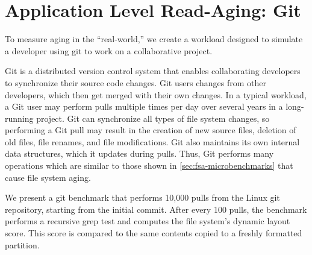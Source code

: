 \section{Application Level Read-Aging: Git}\label{sec:fsa-git}

To measure aging in the ``real-world,'' we create a workload designed to
simulate a developer using git to work on a collaborative project.

Git is a distributed version control system that enables collaborating
developers to synchronize their source code changes.  Git users 
changes from other developers, which then get merged with their own changes.
In a typical workload, a Git user may perform pulls multiple times per day over
several years in a long-running project.  Git can synchronize all types of file
system changes, so performing a Git pull may result in the creation of new
source files, deletion of old files, file renames, and file modifications.  Git
also maintains its own internal data structures, which it updates during pulls.
Thus, Git performs many operations which are similar to those shown in
\cref{sec:fsa-microbenchmarks} that cause file system aging.

We present a git benchmark that performs 10,000 pulls from the Linux git repository, starting
from the initial commit. After every 100 pulls, the benchmark performs a recursive grep
test and computes the file system's dynamic layout score.
This score is compared to the same contents copied to a freshly formatted partition.



